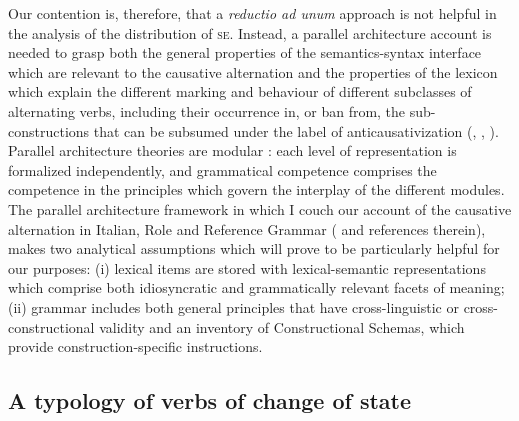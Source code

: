 \documentclass[output=paper,colorlinks,citecolor=brown
]{langscibook}
\begin{document}
Our contention is, therefore, that a \textit{reductio ad unum} approach is not helpful in the analysis of the distribution of \textsc{se}. Instead, a parallel architecture account is needed to grasp both the general properties of the semantics-syntax interface which are relevant to the causative alternation and the properties of the lexicon which explain the different marking and behaviour of different subclasses of alternating verbs, including their occurrence in, or ban from, the sub-constructions that can be subsumed under the label of anticausativization (, , ). Parallel architecture theories are modular \citep{jackendoff2002foundations}: each level of representation is formalized independently, and grammatical competence comprises the competence in the principles which govern the interplay of the different modules. The parallel architecture framework in which I couch our account of the causative alternation in Italian, Role and Reference Grammar (\cite{vanvalin2023principles} and references therein), makes two analytical assumptions which will prove to be particularly helpful for our purposes: (i) lexical items are stored with lexical-semantic representations which comprise both idiosyncratic and grammatically relevant facets of meaning; (ii) grammar includes both general principles that have cross-linguistic or cross-constructional validity and an inventory of Constructional Schemas, which provide construction-specific instructions. 

\subsection{A typology of verbs of change of state}
\label{bentley_section_5.2}
\end{document}
